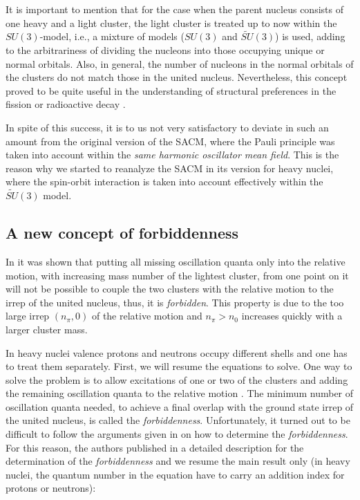 \documentclass[12pt]{article}
\begin{document}
It is important to mention that for the case when the parent nucleus consists of one heavy 
and a light  cluster, the light cluster is treated up to now  
within the $SU(3)$-model, i.e., 
a mixture of models ($SU(3)$ and $\widetilde{SU}(3)$)
is used,
adding to the arbitrariness of dividing
the nucleons into those occupying unique or normal orbitals. Also, in general,
the number of nucleons in the normal orbitals of the clusters do not match
those in the united nucleus. 
Nevertheless, 
this concept proved to be quite  useful  in the understanding of structural preferences 
in the fission or radioactive decay 
\cite{sacm-fission1,sacm-fission2,appl-fission1}.

In spite of this success, it is to us not very satisfactory to 
deviate in such an amount from the
original version of the SACM, where the Pauli principle was taken into account within 
the {\it same harmonic oscillator mean field}.
This is the reason why we started to reanalyze the SACM in its
version for heavy nuclei, where the spin-orbit interaction is taken into account
effectively within the $\widetilde {SU}(3)$ model.

\subsection{A new concept of forbiddenness}
\label{forbiddeness}

In \cite{smirnov} it was shown that putting all 
missing oscillation quanta only into the relative motion,
with increasing mass number of the lightest cluster, 
from one point on it will
not be possible to couple
the two clusters with the relative motion to the irrep of
the united nucleus, thus, it is {\it forbidden}.
This property is due to the too large irrep $(n_\pi ,0)$
of the relative motion and $n_\pi >n_0$ increases
quickly with a larger cluster mass.

In heavy nuclei valence protons and neutrons occupy different shells and 
one has to treat them separately. 
First, we will resume the equations to solve.
One way to solve the problem is to allow
excitations of one  or two of the clusters and adding
the remaining oscillation quanta to the relative 
motion \cite{cseh-letter}. 
The minimum number of oscillation quanta needed, to achieve 
a final overlap with the ground state irrep of the united nucleus,
is called the {\it forbiddenness}.
Unfortunately, it turned out to be difficult to follow the arguments given in \cite{smirnov} on how to
determine the {\it forbiddenness}. For this reason, the authors
published in \cite{huitz-2015} a detailed description 
for the 
determination of the {\it forbiddenness} and we resume
the main result only (in heavy nuclei, the quantum number in the equation have to
carry an addition index for protons or neutrons):
\end{document}
